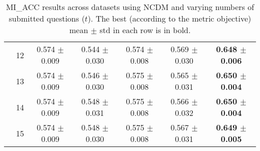 \begin{table*}[t]
{\begin{tabular}{ll c c c c c}
        & 12 & 0.574 $\pm$ 0.009 & 0.544 $\pm$ 0.030 & 0.574 $\pm$ 0.008 & 0.569 $\pm$ 0.030 & \textbf{0.648 $\pm$ 0.006} \\
        & 13 & 0.574 $\pm$ 0.009 & 0.546 $\pm$ 0.030 & 0.575 $\pm$ 0.008 & 0.565 $\pm$ 0.031 & \textbf{0.650 $\pm$ 0.004} \\
        & 14 & 0.574 $\pm$ 0.009 & 0.548 $\pm$ 0.031 & 0.575 $\pm$ 0.008 & 0.566 $\pm$ 0.032 & \textbf{0.650 $\pm$ 0.004} \\
        & 15 & 0.574 $\pm$ 0.009 & 0.548 $\pm$ 0.030 & 0.575 $\pm$ 0.008 & 0.567 $\pm$ 0.031 & \textbf{0.649 $\pm$ 0.005} \\
\bottomrule
\end{tabular}
}
\caption{MI_ACC results across datasets using NCDM and varying numbers of submitted questions ($t$). The best (according to the metric objective) mean $\pm$ std in each row is in bold.}
\label{tab:results-mi_acc-ncdm}
\end{table*}
